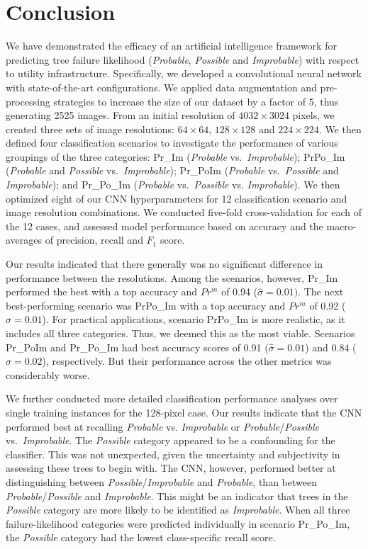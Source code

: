 \documentclass[NewProceedindgs, NoLineNumbers, SectionNumbers, letterpaper, SingleSpace, InsideFigs]{ascelike-new}
\begin{document}
\section{Conclusion}
We have demonstrated the efficacy of an artificial intelligence framework for predicting tree failure likelihood
(\textit{Probable}, \textit{Possible} and \textit{Improbable}) with respect to utility infrastructure. Specifically, we
developed a convolutional neural network with state-of-the-art configurations.  We applied data augmentation and
pre-processing strategies to increase the size of our dataset by a factor of 5, thus generating 2525 images.  From an
initial resolution of $4032 \times 3024$ pixels, we created three sets of image resolutions: $64 \times 64$,
$128 \times 128$ and $224 \times 224$. We then defined four classification scenarios to investigate the performance of
various groupings of the three categories: Pr\_Im (\textit{Probable} vs.\ \textit{Improbable}); PrPo\_Im
(\textit{Probable} and \textit{Possible} vs.\ \textit{Improbable}); Pr\_PoIm (\textit{Probable} vs.\ \textit{Possible}
and \textit{Improbable}); and Pr\_Po\_Im (\textit{Probable} vs.\ \textit{Possible} vs. \textit{Improbable}).
We then optimized eight of our CNN hyperparameters for 12 classification
scenario and image resolution combinations.  We conducted five-fold cross-validation for each of the 12 cases, and
assessed model performance based on accuracy and the macro-averages of precision, recall and $F_{1}$ score.

Our results indicated that there generally was no significant difference in performance between the resolutions.  Among
the scenarios, however, Pr\_Im performed the best with a top accuracy and $Pr^{m}$ of 0.94 ($\hat\sigma = 0.01)$.
The next best-performing scenario was PrPo\_Im with a top accuracy and $Pr^{m}$ of 0.92 ($\hat\sigma = 0.01$).  For
practical applications, scenario PrPo\_Im is more realistic, as it includes all three categories.  Thus, we deemed this
as the most viable.  Scenarios Pr\_PoIm and Pr\_Po\_Im had best accuracy scores of 0.91 ($\hat\sigma = 0.01$) and 0.84
($\hat\sigma = 0.02$), respectively.  But their performance across the other metrics was considerably worse.

We further conducted more detailed classification performance analyses over single training instances for the 128-pixel
case.  Our results indicate that the CNN performed best at recalling \textit{Probable} vs. \textit{Improbable} or
\textit{Probable}/\textit{Possible} vs.\ \textit{Improbable}.  The \textit{Possible} category appeared to be a
confounding for the classifier.  This was not unexpected, given the uncertainty and subjectivity in assessing these trees
to begin with.  The CNN, however, performed better at distinguishing between \textit{Possible}/\textit{Improbable} and
\textit{Probable}, than between \textit{Probable}/\textit{Possible} and \textit{Improbable}.  This might be an indicator
that trees in the \textit{Possible} category are more likely to be identified as \textit{Improbable}.  When all three
failure-likelihood categories were predicted individually in scenario Pr\_Po\_Im, the \textit{Possible} category had the
lowest class-specific recall score.
\end{document}
